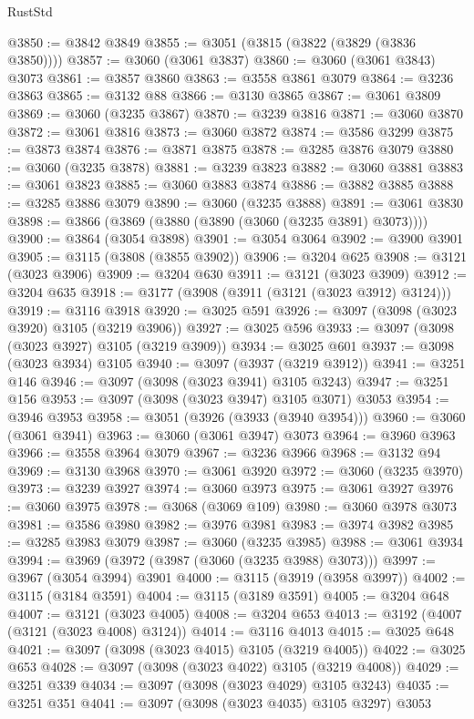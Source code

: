 \begin{lexlean}{RustStd}
\begin{coremodule}
@3850 := @3842 @3849
@3855 := @3051 (@3815 (@3822 (@3829 (@3836 @3850))))
@3857 := @3060 (@3061 @3837)
@3860 := @3060 (@3061 @3843) @3073
@3861 := @3857 @3860
@3863 := @3558 @3861 @3079
@3864 := @3236 @3863
@3865 := @3132 @88
@3866 := @3130 @3865
@3867 := @3061 @3809
@3869 := @3060 (@3235 @3867)
@3870 := @3239 @3816
@3871 := @3060 @3870
@3872 := @3061 @3816
@3873 := @3060 @3872
@3874 := @3586 @3299
@3875 := @3873 @3874
@3876 := @3871 @3875
@3878 := @3285 @3876 @3079
@3880 := @3060 (@3235 @3878)
@3881 := @3239 @3823
@3882 := @3060 @3881
@3883 := @3061 @3823
@3885 := @3060 @3883 @3874
@3886 := @3882 @3885
@3888 := @3285 @3886 @3079
@3890 := @3060 (@3235 @3888)
@3891 := @3061 @3830
@3898 := @3866 (@3869 (@3880 (@3890 (@3060 (@3235 @3891) @3073))))
@3900 := @3864 (@3054 @3898)
@3901 := @3054 @3064
@3902 := @3900 @3901
@3905 := @3115 (@3808 (@3855 @3902))
@3906 := @3204 @625
@3908 := @3121 (@3023 @3906)
@3909 := @3204 @630
@3911 := @3121 (@3023 @3909)
@3912 := @3204 @635
@3918 := @3177 (@3908 (@3911 (@3121 (@3023 @3912) @3124)))
@3919 := @3116 @3918
@3920 := @3025 @591
@3926 := @3097 (@3098 (@3023 @3920) @3105 (@3219 @3906))
@3927 := @3025 @596
@3933 := @3097 (@3098 (@3023 @3927) @3105 (@3219 @3909))
@3934 := @3025 @601
@3937 := @3098 (@3023 @3934) @3105
@3940 := @3097 (@3937 (@3219 @3912))
@3941 := @3251 @146
@3946 := @3097 (@3098 (@3023 @3941) @3105 @3243)
@3947 := @3251 @156
@3953 := @3097 (@3098 (@3023 @3947) @3105 @3071) @3053
@3954 := @3946 @3953
@3958 := @3051 (@3926 (@3933 (@3940 @3954)))
@3960 := @3060 (@3061 @3941)
@3963 := @3060 (@3061 @3947) @3073
@3964 := @3960 @3963
@3966 := @3558 @3964 @3079
@3967 := @3236 @3966
@3968 := @3132 @94
@3969 := @3130 @3968
@3970 := @3061 @3920
@3972 := @3060 (@3235 @3970)
@3973 := @3239 @3927
@3974 := @3060 @3973
@3975 := @3061 @3927
@3976 := @3060 @3975
@3978 := @3068 (@3069 @109)
@3980 := @3060 @3978 @3073
@3981 := @3586 @3980
@3982 := @3976 @3981
@3983 := @3974 @3982
@3985 := @3285 @3983 @3079
@3987 := @3060 (@3235 @3985)
@3988 := @3061 @3934
@3994 := @3969 (@3972 (@3987 (@3060 (@3235 @3988) @3073)))
@3997 := @3967 (@3054 @3994) @3901
@4000 := @3115 (@3919 (@3958 @3997))
@4002 := @3115 (@3184 @3591)
@4004 := @3115 (@3189 @3591)
@4005 := @3204 @648
@4007 := @3121 (@3023 @4005)
@4008 := @3204 @653
@4013 := @3192 (@4007 (@3121 (@3023 @4008) @3124))
@4014 := @3116 @4013
@4015 := @3025 @648
@4021 := @3097 (@3098 (@3023 @4015) @3105 (@3219 @4005))
@4022 := @3025 @653
@4028 := @3097 (@3098 (@3023 @4022) @3105 (@3219 @4008))
@4029 := @3251 @339
@4034 := @3097 (@3098 (@3023 @4029) @3105 @3243)
@4035 := @3251 @351
@4041 := @3097 (@3098 (@3023 @4035) @3105 @3297) @3053

\end{coremodule}
\end{lexlean}
